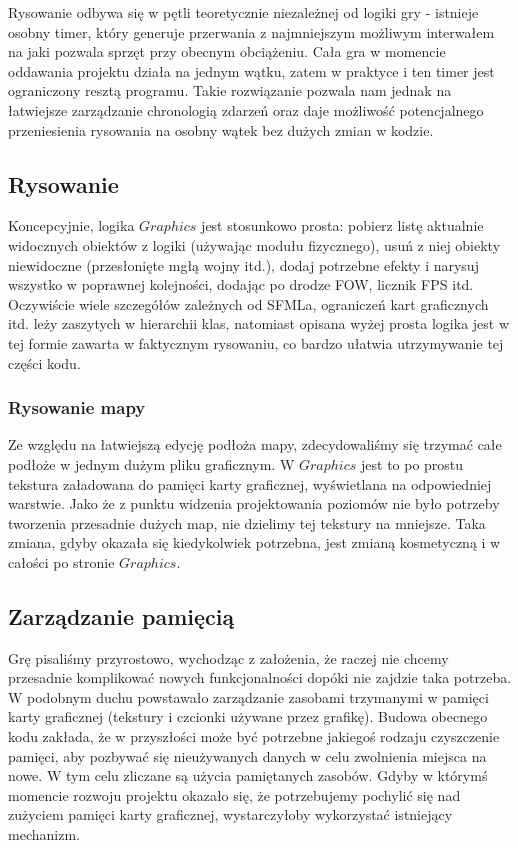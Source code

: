 \documentclass[licencjacka]{pracamgr}
\begin{document}
      Rysowanie odbywa się w pętli teoretycznie niezależnej od logiki gry - istnieje osobny timer, który generuje
      przerwania z najmniejszym możliwym interwałem na jaki pozwala sprzęt przy obecnym obciążeniu. Cała gra w momencie
      oddawania projektu działa na jednym wątku, zatem w praktyce i ten timer jest ograniczony resztą programu. Takie
      rozwiązanie pozwala nam jednak na łatwiejsze zarządzanie chronologią zdarzeń oraz daje możliwość potencjalnego
      przeniesienia rysowania na osobny wątek bez dużych zmian w kodzie.

    \subsection{Rysowanie}
      Koncepcyjnie, logika $Graphics$ jest stosunkowo prosta: pobierz listę aktualnie widocznych obiektów z logiki
      (używając modułu fizycznego), usuń z niej obiekty niewidoczne (przesłonięte mgłą wojny itd.), dodaj potrzebne
      efekty i narysuj wszystko w poprawnej kolejności, dodając po drodze FOW, licznik FPS itd. Oczywiście wiele
      szczegółów zależnych od SFMLa, ograniczeń kart graficznych itd. leży zaszytych w hierarchii klas, natomiast
      opisana wyżej prosta logika jest w tej formie zawarta w faktycznym rysowaniu, co bardzo ułatwia utrzymywanie tej
      części kodu.

    \subsubsection{Rysowanie mapy}
      Ze względu na łatwiejszą edycję podłoża mapy, zdecydowaliśmy się trzymać całe podłoże w jednym dużym pliku
      graficznym. W $Graphics$ jest to po prostu tekstura załadowana do pamięci karty graficznej, wyświetlana na
      odpowiedniej warstwie. Jako że z punktu widzenia projektowania poziomów nie było potrzeby tworzenia przesadnie
      dużych map, nie dzielimy tej tekstury na mniejsze. Taka zmiana, gdyby okazała się kiedykolwiek potrzebna,
      jest zmianą kosmetyczną i w całości po stronie $Graphics$.

    \subsection{Zarządzanie pamięcią}
      Grę pisaliśmy przyrostowo, wychodząc z założenia, że raczej nie chcemy przesadnie komplikować nowych
      funkcjonalności dopóki nie zajdzie taka potrzeba. W podobnym duchu powstawało zarządzanie zasobami trzymanymi w
      pamięci karty graficznej (tekstury i czcionki używane przez grafikę). Budowa obecnego kodu zakłada, że w
      przyszłości może być potrzebne jakiegoś rodzaju czyszczenie pamięci, aby pozbywać się nieużywanych danych w celu
      zwolnienia miejsca na nowe. W tym celu zliczane są użycia pamiętanych zasobów. Gdyby w którymś momencie rozwoju
      projektu okazało się, że potrzebujemy pochylić się nad zużyciem pamięci karty graficznej, wystarczyłoby
      wykorzystać istniejący mechanizm.
\end{document}

